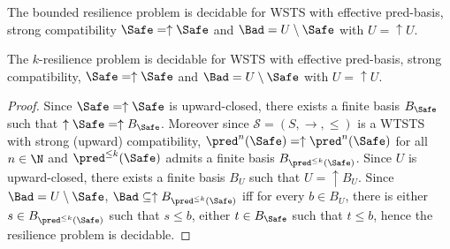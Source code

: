 \begin{corollary}\label{B-up-up}
The bounded resilience problem is decidable for WSTS with effective pred-basis,
strong compatibility
 $\Safe=\uparrow \Safe$
and $\Bad=U \setminus \Safe$ with $U = \uparrow U$.
\end{corollary}


\begin{theorem}\label{k-up-up}
The %
$k$-resilience problem is decidable for WSTS with effective pred-basis, strong %
compatibility, $\Safe=\uparrow \Safe$
and $\Bad=U \setminus \Safe$  with $U = \uparrow U$.
\end{theorem}

\begin{proof}
Since $\Safe=\uparrow \Safe$ is upward-closed, there exists a finite basis $B_{ \Safe}$ such that $\uparrow \Safe = \uparrow B_{\Safe}$. 
Moreover since $\mathscr{S}=(S,\rightarrow,\leq)$ is a WTSTS with strong (upward) compatibility,  $\pred^n(\Safe)=\uparrow \pred^n(\Safe)$ for all $n\in \N$ and $\pred^{\leq k}(\Safe)$ admits a finite basis $B_{\pred^{\leq k}(\Safe)}$. %
Since $U$  is upward-closed, there exists a finite basis $B_{U}$ such that $U = \uparrow B_{U}$. %
Since $\Bad = U \setminus \Safe$, $\Bad \subseteq \uparrow B_{\pred^{\leq k}(\Safe)}$ iff for every $b \in B_{U}$, there is either $s \in B_{\pred^{\leq k}(\Safe)}$ such that $s \leq b$, either $t \in B_{\Safe}$ such that $t\leq b$,
hence the resilience problem is decidable.
\end{proof}








